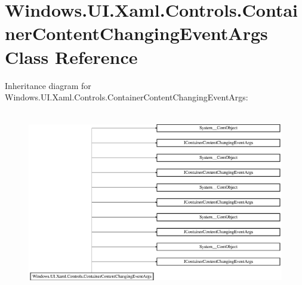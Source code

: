 \hypertarget{class_windows_1_1_u_i_1_1_xaml_1_1_controls_1_1_container_content_changing_event_args}{}\section{Windows.\+U\+I.\+Xaml.\+Controls.\+Container\+Content\+Changing\+Event\+Args Class Reference}
\label{class_windows_1_1_u_i_1_1_xaml_1_1_controls_1_1_container_content_changing_event_args}
Inheritance diagram for Windows.\+U\+I.\+Xaml.\+Controls.\+Container\+Content\+Changing\+Event\+Args\+:\begin{figure}[H]
\begin{center}
\leavevmode
\includegraphics[height=8.041776cm]{class_windows_1_1_u_i_1_1_xaml_1_1_controls_1_1_container_content_changing_event_args}
\end{center}
\end{figure}
